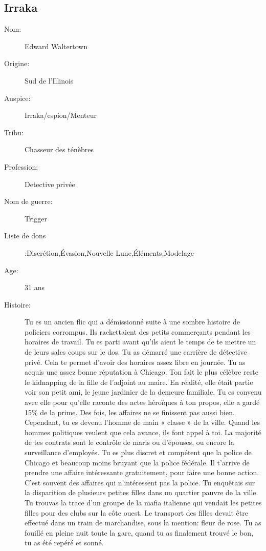 \documentclass[oneside,12pt]{book}
\begin{document}
\begin{flushleft}
\section{Irraka}
\begin{description}
\item[Nom:]{ Edward Waltertown}
\item[Origine:]{Sud de l'Illinois}
\item[Auspice:]{Irraka/espion/Menteur}
\item[Tribu:]{Chasseur des ténèbres}
\item[Profession:]{Detective privée}
\item[Nom de guerre:]{Trigger}
\item[Liste de dons]:Discrétion,Évasion,Nouvelle Lune,Éléments,Modelage
\item[Age:]{31 ans}
\item[Histoire:]{Tu es un ancien flic qui a démissionné suite à une sombre histoire de policiers corrompus. 
Ils rackettaient des petits commerçants pendant les horaires de travail. 
Tu es parti avant qu'ils aient le temps de te mettre un de leurs sales coups sur le dos. 
Tu as démarré une carrière de détective privé. Cela te permet d'avoir des horaires assez libre en journée. 
Tu as acquis une assez bonne réputation à Chicago. Ton fait le plus célèbre reste le kidnapping de la fille de l'adjoint au maire. 
En réalité, elle était partie voir son petit ami, le jeune jardinier de la demeure familiale. 
Tu es convenu avec elle pour qu'elle raconte des actes héroïques à ton propos, elle a gardé 15\% de la prime. 
Des fois, les affaires ne se finissent pas aussi bien. Cependant, tu es devenu l'homme de main « classe » de la ville. 
Quand les hommes politiques veulent que cela avance, ils font appel à toi. 
La majorité de tes contrats sont le contrôle de maris ou d'épouses, ou encore la surveillance d'employés.
Tu es plus discret et compétent que la police de Chicago et beaucoup moins bruyant que la police fédérale. 
Il t'arrive de prendre une affaire intéressante gratuitement, pour faire une bonne action. C'est souvent des affaires qui n'intéressent pas la police.
Tu enquêtais sur la disparition de plusieurs petites filles dans un quartier pauvre de la ville. 
Tu trouvas la trace d'un groupe de la mafia italienne qui vendait les petites filles pour des clubs sur la côte ouest. 
Le transport des filles devait être effectué dans un train de marchandise, sous la mention: fleur de rose. 
Tu as fouillé en pleine nuit toute la gare, quand tu as finalement trouvé le bon, tu as été repéré et sonné. 
}
\end{description}
\end{flushleft}
\end{document}
